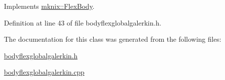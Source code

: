 Implements \hyperlink{classmknix_1_1_flex_body_a0058d01bf9b5b90b22a9f4d6ca0745de}{mknix\+::\+Flex\+Body}.



Definition at line 43 of file bodyflexglobalgalerkin.\+h.



The documentation for this class was generated from the following files\+:\begin{DoxyCompactItemize}
\item 
\hyperlink{bodyflexglobalgalerkin_8h}{bodyflexglobalgalerkin.\+h}\item 
\hyperlink{bodyflexglobalgalerkin_8cpp}{bodyflexglobalgalerkin.\+cpp}\end{DoxyCompactItemize}
